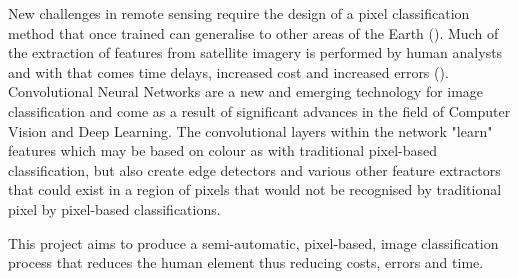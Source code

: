 New challenges in remote sensing require the design of a pixel classification method that once trained can generalise to other areas of the Earth (\cite{maggiori17a}). Much of the extraction of features from satellite imagery is performed by human analysts and with that comes time delays, increased cost and increased errors (\cite{mnih13}).
Convolutional Neural Networks are a new and emerging technology for image classification and come as a result of significant advances in the field of Computer Vision and Deep Learning. The convolutional layers within the network "learn" features which may be based on colour as with traditional pixel-based classification, but also create edge detectors and various other feature extractors that could exist in a region of pixels that would not be recognised by traditional pixel by pixel-based classifications.
\par
This project aims to produce a semi-automatic, pixel-based, image classification process that reduces the human element thus reducing costs, errors and time.

